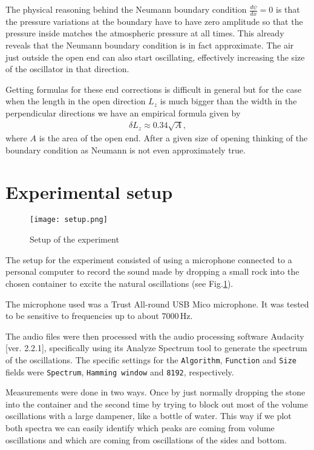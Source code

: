 \documentclass[10pt,a4paper,twocolumn]{article}
\begin{document}
The physical reasoning behind the Neumann boundary condition $\frac{d\psi}{dx} = 0$ is that the pressure variations at the boundary have to have zero amplitude so that the pressure inside matches the atmospheric pressure at all times. This already reveals that the Neumann boundary condition is in fact approximate. The air just outside the open end can also start oscillating, effectively increasing the size of the oscillator in that direction.

Getting formulas for these end corrections is difficult in general but for the case when the length in the open direction $L_z$ is much bigger than the  width in the perpendicular directions we have an empirical formula given by
%
\begin{align}
\delta L_z \approx 0.34 \sqrt{A},
\end{align}
%
where $A$ is the area of the open end.\cite{endcorr} After a given size of opening thinking of the boundary condition as Neumann is not even approximately true.\cite{advendcorr}


\section{Experimental setup} 

\begin{figure}
\centering
\captionsetup{justification=centering}
\texttt{[image: setup.png]}
\caption{Setup of the experiment}
\label{setup}
\end{figure}

The setup for the experiment consisted of using a microphone connected to a personal computer to record the sound made by dropping a small rock into the chosen container to excite the natural oscillations (see Fig.\ref{setup}).

The microphone used was a Trust All-round USB Mico microphone. It was tested to be sensitive to frequencies up to about $7000 \, \mathrm{Hz}$.

The audio files were then processed with the audio processing software Audacity [ver. 2.2.1], specifically using its Analyze Spectrum tool to generate the spectrum of the oscillations. The specific settings for the \texttt{Algorithm}, \texttt{Function} and \texttt{Size} fields were \texttt{Spectrum}, \texttt{Hamming window} and \texttt{8192}, respectively.

Measurements were done in two ways. Once by just normally dropping the stone into the container and the second time by trying to block out most of the volume oscillations with a large dampener, like a bottle of water. This way if we plot both spectra we can easily identify which peaks are coming from volume oscillations and which are coming from oscillations of the sides and bottom.
\end{document}
